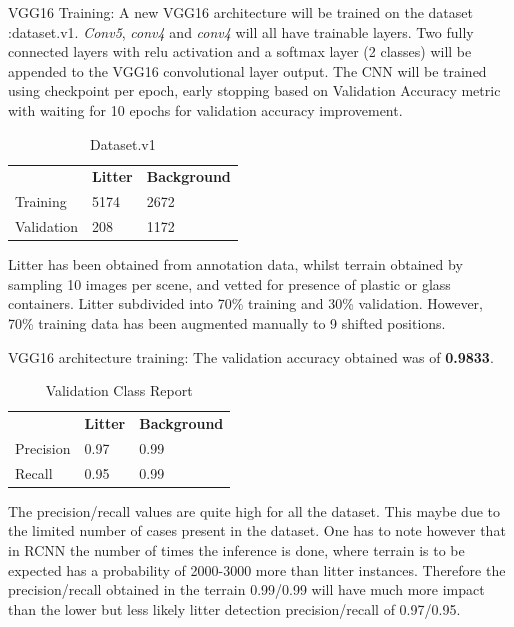 \documentclass{IEEEtran}
\begin{document}
VGG16 Training: A new VGG16 architecture will be trained on the dataset :dataset.v1. \textit{Conv5}, \textit{conv4} and \textit{conv4} will all have trainable layers. Two fully connected layers with relu activation and a softmax layer (2 classes) will be appended to the VGG16 convolutional layer output.
The CNN will be trained using checkpoint per epoch, early stopping based on Validation Accuracy metric with waiting for 10 epochs for validation accuracy improvement. 

\begin{table}[h]
\centering
\caption{Dataset.v1}
\begin{tabular}{lll}
\textbf{}  & \textbf{Litter} & \textbf{Background} \\
Training   & 5174            & 2672                \\
Validation & 208             & 1172               
\end{tabular}
\end{table}

Litter has been obtained from annotation data, whilst terrain obtained by sampling 10 images per scene, and vetted for presence of plastic or glass containers. Litter subdivided into 70\% training and 30\%  validation. However, 70\% training data has been augmented manually to 9 shifted positions.\newline

VGG16 architecture training: The validation accuracy obtained was of \textbf{0.9833}. \newline

\begin{table}[h]
\centering
\caption{Validation Class Report}
\begin{tabular}{lll}
\textbf{} & \textbf{Litter} & \textbf{Background} \\
Precision & 0.97            & 0.99                \\
Recall    & 0.95            & 0.99               
\end{tabular}
\end{table}

The precision/recall values are quite high for all the dataset. This maybe due to the limited number of cases present in the dataset. One has to note however that in RCNN the number of times the inference is done, where terrain is to be expected has a probability of 2000-3000 more than litter instances. Therefore the precision/recall obtained in the terrain 0.99/0.99 will have much more impact than the lower but less likely litter detection precision/recall  of 0.97/0.95.\newline
\end{document}
